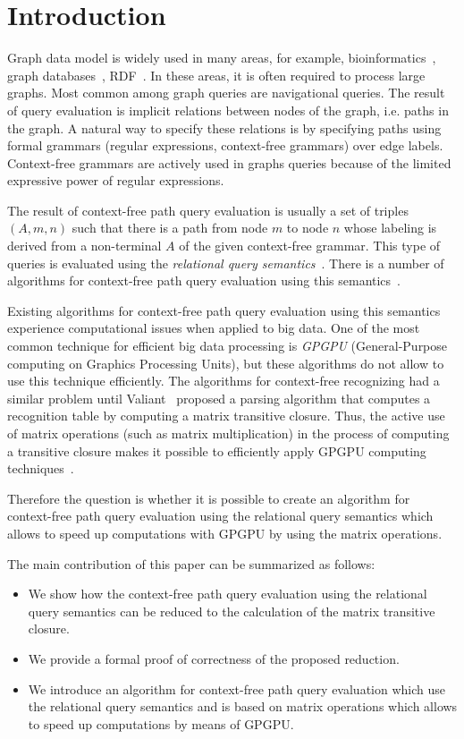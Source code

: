 \section{Introduction}
Graph data model is widely used in many areas, for example, bioinformatics~\cite{Bio}, graph databases~\cite{graphDB}, RDF~\cite{RDF}. In these areas, it is often required to process large graphs. Most common among graph queries are navigational queries. The result of query evaluation is implicit relations between nodes of the graph, i.e. paths in the graph. A natural way to specify these relations is by specifying paths using formal grammars (regular expressions, context-free grammars) over edge labels. Context-free grammars are actively used in graphs queries because of the limited expressive power of regular expressions. 

The result of context-free path query evaluation is usually a set of triples $(A, m, n)$ such that there is a path from node $m$ to node $n$ whose labeling is derived from a non-terminal $A$ of the given context-free grammar. This type of queries is evaluated using the \textit{relational query semantics}~\cite{hellingsRelational}. There is a number of algorithms for context-free path query evaluation using this semantics~\cite{GLL, hellingsRelational, RDF}.

Existing algorithms for context-free path query evaluation using this semantics experience computational issues when applied to big data. One of the most common technique for efficient big data processing is \textit{GPGPU} (General-Purpose computing on Graphics Processing Units), but these algorithms do not allow to use this technique efficiently. The algorithms for context-free recognizing had a similar problem until Valiant~\cite{valiant} proposed a parsing algorithm that computes a recognition table by computing a matrix transitive closure. Thus, the active use of matrix operations (such as matrix multiplication) in the process of computing a transitive closure makes it possible to efficiently apply GPGPU computing techniques~\cite{matricesOnGPGPU}.

Therefore the question is whether it is possible to create an algorithm for context-free path query evaluation using the relational query semantics which allows to speed up computations with GPGPU by using the matrix operations.

The main contribution of this paper can be summarized as follows:
\begin{itemize}
	\item We show how the context-free path query evaluation using the relational query semantics can be reduced to the calculation of the matrix transitive closure.
	\item We provide a formal proof of correctness of the proposed reduction.
	\item We introduce an algorithm for context-free path query evaluation which use the relational query semantics and is based on matrix operations which allows to speed up computations by means of GPGPU.
\end{itemize}
